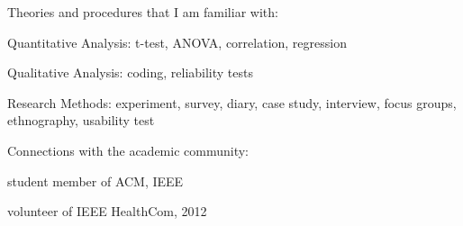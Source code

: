 \documentclass[margin,line]{resume}
\begin{document}
\begin{resume}
    Theories and procedures that I am familiar with:
    \begin{list2}
    \item Quantitative Analysis: t-test, ANOVA, correlation, regression
    \item Qualitative Analysis: coding, reliability tests
    \item Research Methods: experiment, survey, diary, case study, interview, focus groups, ethnography, usability test
    \end{list2}
    
    Connections with the academic community:
    \begin{list2}
    \item student member of ACM, IEEE
    \item volunteer of IEEE HealthCom, 2012
    \end{list2}
    

\end{resume}
\end{document}
